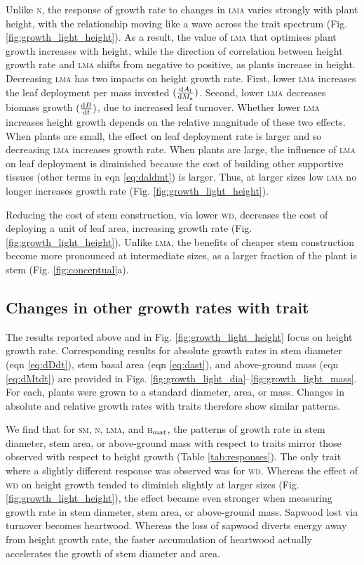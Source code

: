 \documentclass[9pt,twocolumn,twoside,lineno]{pnas-new}
\newcommand{\lma}{\textsc{lma}}
\newcommand{\wood}{\textsc{wd}}
\newcommand{\seed}{\textsc{sm}}
\newcommand{\hmat}{\textsc{h}$_{\rm mat}$}
\newcommand{\nitrogen}{\textsc{n}}
\begin{document}
Unlike {\nitrogen}, the response of growth rate to changes in {\lma} varies strongly with plant height, with the relationship moving like a wave across the trait spectrum (Fig. \ref{fig:growth_light_height}). As a result, the value of {\lma} that optimises plant growth increases with height, while the direction of correlation between height growth rate and {\lma} shifts from negative to positive, as plants increase in height. Decreasing {\lma} has two impacts on height growth rate. First, lower {\lma} increases the leaf deployment per mass invested $(\frac{{\rm d}A_{\rm l}}{{\rm d}M_{\rm a}})$. Second, lower {\lma} decreases biomass growth $(\frac{{\rm d}B}{{\rm d}t})$, due to increased leaf turnover. Whether lower {\lma} increases height growth depends on the relative magnitude of these two effects. When plants are small, the effect on leaf deployment rate is larger and so decreasing {\lma} increases growth rate. When plants are large, the influence of {\lma} on leaf deployment is diminished because the cost of building other supportive tissues (other terms in eqn \ref{eq:daldmt}) is larger. Thus, at larger sizes low {\lma} no longer increases growth rate (Fig. \ref{fig:growth_light_height}).

Reducing the cost of stem construction, via lower {\wood}, decreases the cost of deploying a unit of leaf area, increasing growth rate (Fig. \ref{fig:growth_light_height}). Unlike {\lma}, the benefits of cheaper stem construction become more pronounced at intermediate sizes, as a larger fraction of the plant is stem (Fig. \ref{fig:conceptual}a).

\subsection{Changes in other growth rates with trait}

The results reported above and in Fig. \ref{fig:growth_light_height} focus on height growth rate. Corresponding results for absolute growth rates in stem diameter (eqn \ref{eq:dDdt}), stem basal area (eqn \ref{eq:dast}), and above-ground mass (eqn \ref{eq:dMtdt}) are provided in Figs. \ref{fig:growth_light_dia}--\ref{fig:growth_light_mass}. For each, plants were grown to a standard diameter, area, or mass. Changes in absolute and relative growth rates with traits therefore show similar patterns.

We find that for {\seed}, {\nitrogen}, {\lma}, and {\hmat}, the patterns of growth rate in stem diameter, stem area, or above-ground mass with respect to traits mirror those observed with respect to height growth (Table \ref{tab:responses}). The only trait where a slightly different response was observed was for {\wood}. Whereas the effect of {\wood} on height growth tended to diminish slightly at larger sizes (Fig. \ref{fig:growth_light_height}), the effect became even stronger when measuring growth rate in stem diameter, stem area, or above-ground mass. Sapwood lost via turnover becomes heartwood. Whereas the loss of sapwood diverts energy away from height growth rate, the faster accumulation of heartwood actually accelerates the growth of stem diameter and area.
\end{document}
